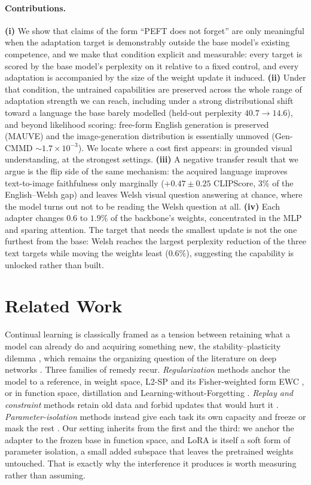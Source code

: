 \documentclass{article}
\begin{document}
\paragraph{Contributions.}
\textbf{(i)} We show that claims of the form ``PEFT does not forget'' are only
meaningful when the adaptation target is demonstrably outside the base model's
existing competence, and we make that condition explicit and measurable: every
target is scored by the base model's perplexity on it relative to a fixed
control, and every adaptation is accompanied by the size of the weight update it
induced.
\textbf{(ii)} Under that condition, the untrained capabilities are preserved
across the whole range of adaptation strength we can reach, including under a
strong distributional shift toward a language the base barely modelled (held-out
perplexity $40.7\to14.6$), and beyond likelihood scoring: free-form English
generation is preserved (MAUVE) and the image-generation distribution is
essentially unmoved (Gen-CMMD $\sim\!1.7\times10^{-3}$). We locate where a cost
first appears: in grounded visual understanding, at the strongest settings.
\textbf{(iii)} A negative transfer result that we argue is the flip side of the
same mechanism: the acquired language improves text-to-image faithfulness only
marginally ($+0.47\pm0.25$ CLIPScore, $3\%$ of the English--Welsh gap) and leaves
Welsh visual question answering at chance, where the model turns out not to be
reading the Welsh question at all.
\textbf{(iv)} Each adapter changes $0.6$ to $1.9\%$ of the backbone's weights,
concentrated in the MLP and sparing attention. The target that needs the smallest
update is not the one furthest from the base: Welsh reaches the largest
perplexity reduction of the three text targets while moving the weights least
($0.6\%$), suggesting the capability is unlocked rather than built.

\section{Related Work}
Continual learning is classically framed as a tension between retaining what a
model can already do and acquiring something new, the stability--plasticity
dilemma \citep{mermillod2013stability}, which remains the organizing question of
the literature on deep networks \citep{delange2022survey, wang2024clsurvey}.
Three families of remedy recur. \emph{Regularization} methods anchor the model to
a reference, in weight space, L2-SP \citep{xuhong2018l2sp} and its
Fisher-weighted form EWC \citep{kirkpatrick2017ewc}, or in function space,
distillation \citep{hinton2015distilling} and Learning-without-Forgetting
\citep{li2017lwf}. \emph{Replay and constraint} methods retain old data and
forbid updates that would hurt it \citep{lopezpaz2017gem, chaudhry2019agem}.
\emph{Parameter-isolation} methods instead give each task its own capacity and
freeze or mask the rest \citep{rusu2016progressive, mallya2018packnet,
serra2018hat}. Our setting inherits from the first and the third: we anchor the
adapter to the frozen base in function space, and LoRA is itself a soft form of
parameter isolation, a small added subspace that leaves the pretrained weights
untouched. That is exactly why the interference it produces is worth measuring
rather than assuming.
\end{document}
